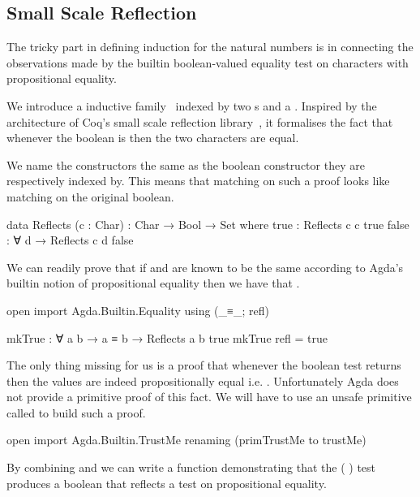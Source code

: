 \documentclass[twocolumn]{article}
\begin{document}
\subsection{Small Scale Reflection}

The tricky part in defining induction for the natural numbers is in
connecting the observations made by the builtin boolean-valued equality
test on characters \AF{\_==\_} with propositional equality.

We introduce a  inductive family~\cite{dybjer1994inductive}
indexed by two s and a . Inspired by the architecture of
Coq's small scale reflection library~\cite{assia_mahboubi_2021_4457887},
it formalises the fact that whenever the boolean is  then the two
characters are equal.

We name the  constructors the same as the boolean constructor
they are respectively indexed by. This means that matching on such a proof
looks like matching on the original boolean.

\begin{code}
data Reflects (c : Char) : Char → Bool → Set where
  true  : Reflects c c true
  false : ∀ {d} → Reflects c d false
\end{code}

We can readily prove that if  and  are known to be the same
according to Agda's builtin notion of propositional equality then we have
that {   }.

\begin{code}
open import Agda.Builtin.Equality using (_≡_; refl)

mkTrue : ∀ {a b} → a ≡ b → Reflects a b true
mkTrue refl = true
\end{code}

The only thing missing for us is a proof that whenever the boolean test
{ \AF{==} } returns  then the values are indeed
propositionally equal i.e. {  }.
Unfortunately Agda does not provide a primitive proof of this fact.
We will have to use an unsafe primitive called  to build
such a proof.

\begin{code}
open import Agda.Builtin.TrustMe
  renaming (primTrustMe to trustMe)
\end{code}

By combining  and  we can write a function demonstrating
that the {( \AF{==} )} test produces a boolean that reflects a test
on propositional equality.
\end{document}
